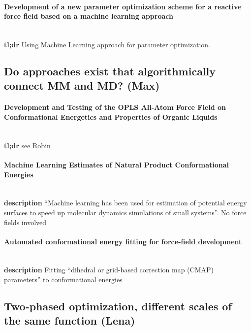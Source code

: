 \documentclass[preprint,12pt]{elsarticle}
\begin{document}
\paragraph{Development of a new parameter optimization scheme for a reactive force field based on a machine learning approach}
\cite{Nakata2019} 
\\ \textbf{tl;dr} Using Machine Learning approach for parameter optimization.



\subsection{Do approaches exist that algorithmically connect MM and MD? (Max)}
\paragraph{Development and Testing of the OPLS All-Atom Force Field on Conformational Energetics and Properties of Organic Liquids}
\cite{Jorgensen2996}
\\ \textbf{tl;dr} see Robin
\paragraph{Machine Learning Estimates of Natural Product Conformational Energies}
\\ \textbf{description} ``Machine learning has been used for estimation of potential energy surfaces to speed up molecular dynamics simulations of small systems''. No force fields involved
\paragraph{Automated conformational energy fitting for force-field development}
\\ \textbf{description} Fitting ``dihedral or grid-based correction map (CMAP) parameters'' to conformational energies




\subsection{Two-phased optimization, different scales of the same function (Lena)}
\end{document}
